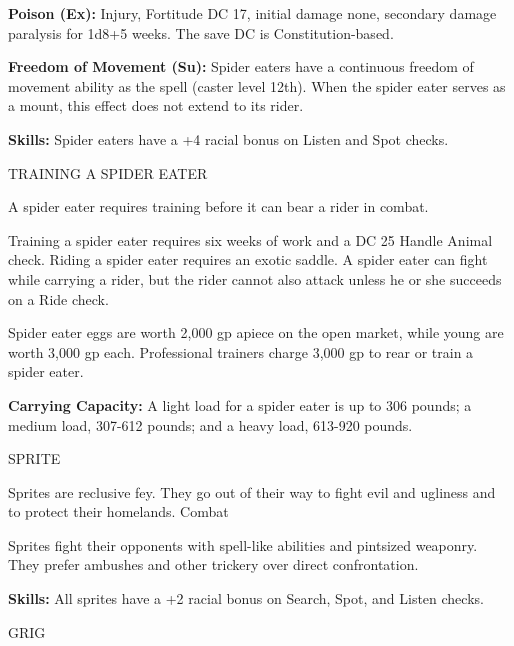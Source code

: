 \documentclass{article}
\begin{document}
\textbf{Poison (Ex):} Injury, Fortitude DC 17, initial damage none, secondary damage 
paralysis for 1d8+5 weeks. The save DC is Constitution-based.

\textbf{Freedom of Movement (Su): }Spider eaters have a continuous freedom of movement 
ability as the spell (caster level 12th). When the spider eater serves as a mount, 
this effect does not extend to its rider.

\textbf{Skills:} Spider eaters have a +4 racial bonus on Listen and Spot checks.

TRAINING A SPIDER EATER

A spider eater requires training before it can bear a rider in combat.

Training a spider eater requires six weeks of work and a DC 25 Handle Animal check. 
Riding a spider eater requires an exotic saddle. A spider eater can fight while 
carrying a rider, but the rider cannot also attack unless he or she succeeds on 
a Ride check. 

Spider eater eggs are worth 2,000 gp apiece on the open market, while young are 
worth 3,000 gp each. Professional trainers charge 3,000 gp to rear or train a spider 
eater.

\textbf{Carrying Capacity: }A light load for a spider eater is up to 306 pounds; 
a medium load, 307-612 pounds; and a heavy load, 613-920 pounds.

\vspace{12pt}
{\LARGE{}SPRITE}

Sprites are reclusive fey. They go out of their way to fight evil and ugliness 
and to protect their homelands. Combat

Sprites fight their opponents with spell-like abilities and pintsized weaponry. 
They prefer ambushes and other trickery over direct confrontation.

\textbf{Skills:} All sprites have a +2 racial bonus on Search, Spot, and Listen 
checks.

\vspace{12pt}
GRIG
\end{document}
